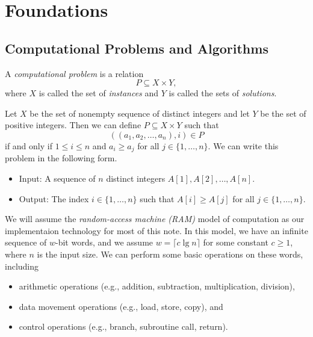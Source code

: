 \chapter{Foundations}
\section{Computational Problems and Algorithms}
\begin{definition}
  A \emph{computational problem} is a relation
  \begin{equation*}
    P \subseteq X \times Y,
  \end{equation*}
  where $X$ is called the set of \emph{instances} and $Y$ is called the sets of
  \emph{solutions}.
\end{definition}

\begin{example}
  Let $X$ be the set of nonempty sequence of distinct integers and let $Y$
  be the set of positive integers.
  Then we can define $P \subseteq X \times Y$ such that
  \begin{equation*}
    ((a_1, a_2, \dots, a_n), i) \in P
  \end{equation*}
  if and only if $1 \leq i \leq n$ and $a_i \geq a_j$ for all
  $j \in \{1, \dots, n\}$.
  We can write this problem in the following form.
\end{example}
\begin{problem}
  \label{prob:champion}
  \leavevmode
  \begin{itemize}
    \item Input: A sequence of $n$ distinct integers $A[1], A[2], \dots, A[n]$.
    \item Output: The index $i \in \{1, \dots, n\}$ such that $A[i] \geq A[j]$
    for all $j \in \{1, \dots, n\}$.
  \end{itemize}
\end{problem}

\begin{definition}
  We will assume the \emph{random-access machine (RAM)} model of computation as
  our implementaion technology for most of this note.
  In this model, we have an infinite sequence of $w$-bit words, and we assume
  $w = \lceil c \lg n \rceil$ for some constant $c \geq 1$, where $n$ is the
  input size.
  We can perform some basic operations on these words, including
  \begin{itemize}
    \item arithmetic operations (e.g., addition, subtraction, multiplication,
    division),
    \item data movement operations (e.g., load, store, copy), and
    \item control operations (e.g., branch, subroutine call, return).
  \end{itemize}
\end{definition}


